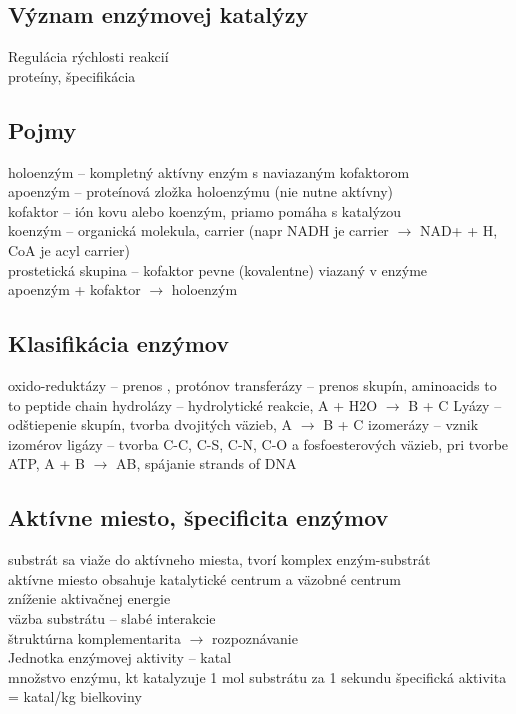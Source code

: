 \subsection{Význam enzýmovej katalýzy}
Regulácia rýchlosti reakcií\\
proteíny, špecifikácia\\
\subsection{Pojmy}
holoenzým -- kompletný aktívny enzým s naviazaným kofaktorom\\
apoenzým -- proteínová zložka holoenzýmu (nie nutne aktívny)\\
kofaktor -- ión kovu alebo koenzým, priamo pomáha s katalýzou\\
koenzým -- organická molekula, carrier (napr NADH je \el carrier $\rightarrow$ NAD+ + H, CoA je acyl carrier)\\
prostetická skupina -- kofaktor pevne (kovalentne) viazaný v enzýme\\
apoenzým + kofaktor $\rightarrow$ holoenzým
\subsection{Klasifikácia enzýmov}
oxido-reduktázy -- prenos \el, protónov
transferázy -- prenos skupín, aminoacids to to peptide chain
hydrolázy -- hydrolytické reakcie, A + H2O $\rightarrow$ B + C
Lyázy -- odštiepenie skupín, tvorba dvojitých väzieb, A $\rightarrow$ B + C
izomerázy -- vznik izomérov
ligázy -- tvorba C-C, C-S, C-N, C-O a fosfoesterových väzieb, pri tvorbe ATP, A + B $\rightarrow$ AB, spájanie strands of DNA
\subsection{Aktívne miesto, špecificita enzýmov}
substrát sa viaže do aktívneho miesta, tvorí komplex enzým-substrát\\
aktívne miesto obsahuje katalytické centrum a väzobné centrum\\
zníženie aktivačnej energie\\
väzba substrátu -- slabé interakcie\\
štruktúrna komplementarita $\rightarrow$ rozpoznávanie\\

Jednotka enzýmovej aktivity -- katal\\
\tab množstvo enzýmu, kt katalyzuje 1 mol substrátu za 1 sekundu
\tab špecifická aktivita = katal/kg bielkoviny
